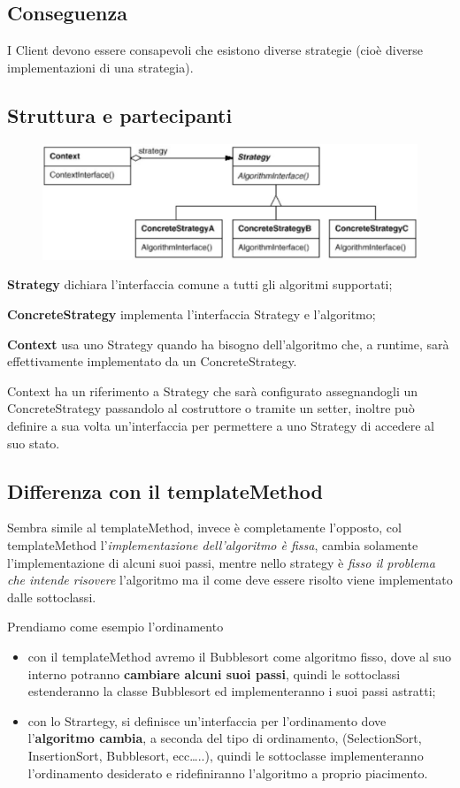 \subsection{Conseguenza}

I Client devono essere consapevoli che esistono diverse strategie (cioè diverse implementazioni di una strategia).

\subsection{Struttura e partecipanti}

\begin{figure}[H]
    \centering   
    \includegraphics[width=0.5\linewidth]{../../immagini/templateMethod_Strategy/struttura_strategy}    
\end{figure}

\textbf{Strategy} dichiara l’interfaccia comune a tutti gli algoritmi supportati;

\textbf{ConcreteStrategy} implementa l’interfaccia Strategy e l’algoritmo;

\textbf{Context} usa uno Strategy quando ha bisogno dell’algoritmo che, a runtime, sarà effettivamente implementato da un ConcreteStrategy.

Context ha un riferimento a Strategy che sarà configurato assegnandogli un ConcreteStrategy passandolo al costruttore o tramite un setter, inoltre può definire a sua 
volta un’interfaccia per permettere a uno Strategy di accedere al suo stato.

\subsection{Differenza con il templateMethod}

Sembra simile al templateMethod, invece è completamente l'opposto, col templateMethod l'\textit{implementazione dell'algoritmo è fissa}, cambia solamente 
l'implementazione di alcuni suoi passi, mentre nello strategy è \textit{fisso il problema che intende risovere} l'algoritmo ma il come deve essere risolto viene 
implementato dalle sottoclassi. 

Prendiamo come esempio l'ordinamento

\begin{itemize}
    \item con il templateMethod avremo il Bubblesort come algoritmo fisso, dove al suo interno potranno \textbf{cambiare alcuni suoi passi}, quindi le sottoclassi
    estenderanno la classe Bubblesort ed implementeranno i suoi passi astratti;
    \item con lo Strartegy, si definisce un'interfaccia per l'ordinamento dove l'\textbf{algoritmo cambia}, a seconda del tipo di ordinamento,  
    (SelectionSort, InsertionSort, Bubblesort, ecc\dots..), quindi le sottoclasse implementeranno l'ordinamento desiderato e ridefiniranno l'algoritmo a proprio 
    piacimento.
\end{itemize}

